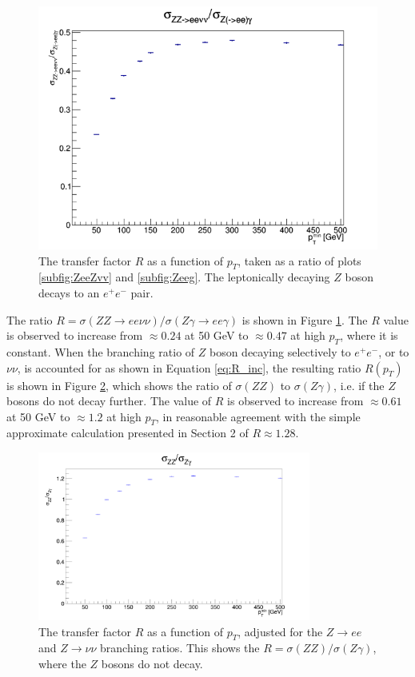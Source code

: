 \documentclass[11pt,a4paper,final]{report}
\begin{document}
\begin{figure}[H]
	\centering
	\includegraphics[scale=0.7]{Ratio_default.png}
	\caption{The transfer factor $R$ as a function of $p_T$, taken as a ratio of plots \ref{subfig:ZeeZvv} and \ref{subfig:Zeeg}. The leptonically decaying $Z$ boson decays to an $e^+e^-$ pair.}
	\label{fig:Rcurve}
\end{figure}
The ratio $R = \sigma(ZZ\rightarrow ee\nu\nu)/\sigma(Z\gamma\rightarrow ee\gamma)$ is shown in Figure \ref{fig:Rcurve}. The $R$ value is observed to increase from $\approx 0.24$ at 50 GeV to $\approx 0.47$ at high $p_T$, where it is constant. When the branching ratio of $Z$ boson decaying selectively to $e^+e^-$, or to $\nu\nu$, is accounted for as shown in Equation \ref{eq:R_inc}, the resulting ratio $R(p_T)$ is shown in Figure \ref{fig:RcurveBR}, which shows the ratio of $\sigma(ZZ)$ to $\sigma(Z\gamma)$, i.e. if the $Z$ bosons do not decay further. The value of $R$ is observed to increase from $\approx 0.61$ at 50 GeV to $\approx 1.2$ at high $p_T$, in reasonable agreement with the simple approximate calculation presented in Section 2 of $R \approx 1.28$.
\begin{figure}[H]
	\centering
	\includegraphics[width = 0.8\textwidth]{Ratio_with_BR.png}
	\caption{The transfer factor $R$ as a function of $p_T$, adjusted for the $Z\rightarrow ee$ and $Z\rightarrow \nu\nu$ branching ratios. This shows the $R=\sigma(ZZ)/\sigma(Z\gamma)$, where the $Z$ bosons do not decay.}
	\label{fig:RcurveBR}
\end{figure}
\end{document}
